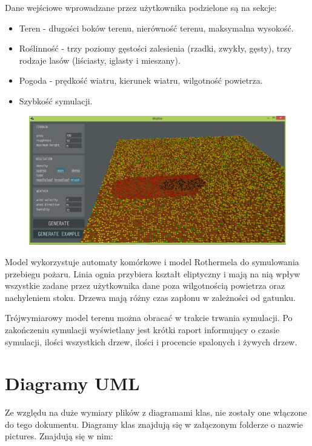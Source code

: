 \documentclass[a4paper, 11pt]{article}
\begin{document}
	Dane wejściowe wprowadzane przez użytkownika podzielone są na sekcje: 
		\begin{itemize}
			\item Teren - długości boków terenu, nierówność terenu, maksymalna wysokość.
			\item Roślinność - trzy poziomy gęstości zalesienia (rzadki, zwykły, gęsty), trzy rodzaje lasów (liściasty, iglasty i mieszany).
			\item Pogoda - prędkość wiatru, kierunek wiatru, wilgotność powietrza.
			\item Szybkość symulacji.
		\end{itemize}
		\begin{figure}[H]
			\centerline{\includegraphics[scale=0.4]{pictures/gui1.png}}
		\end{figure}
		
	Model wykorzystuje automaty komórkowe i model Rothermela do symulowania przebiegu pożaru. Linia ognia przybiera kształt eliptyczny i mają na nią wpływ wszystkie zadane przez użytkownika dane poza wilgotnością powietrza oraz nachyleniem stoku. Drzewa mają różny czas zapłonu w zależności od gatunku.
	
	Trójwymiarowy model terenu można obracać w trakcie trwania symulacji. Po zakończeniu symulacji wyświetlany jest krótki raport informujący o czasie symulacji, ilości wszystkich drzew, ilości i procencie spalonych i żywych drzew. 
	
	\section{Diagramy UML}
	\indent
	
	Ze względu na duże wymiary plików z diagramami klas, nie zostały one włączone do tego dokumentu. Diagramy klas znajdują się w załączonym folderze o nazwie pictures. Znajdują się w nim: \\
	
\end{document}
